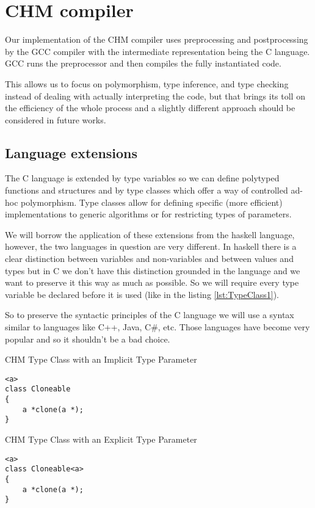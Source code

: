 \chapter{CHM compiler}

Our implementation of the CHM compiler uses preprocessing and postprocessing by the GCC compiler with the intermediate representation being the C language. GCC runs the preprocessor and then compiles the fully instantiated code.

This allows us to focus on polymorphism, type inference, and type checking instead of dealing with actually interpreting the code, but that brings its toll on the efficiency of the whole process and a slightly different approach should be considered in future works.

\section{Language extensions}

The C language is extended by type variables so we can define polytyped functions and structures and by type classes which offer a way of controlled ad-hoc polymorphism. Type classes allow for defining specific (more efficient) implementations to generic algorithms or for restricting types of parameters.

We will borrow the application of these extensions from the haskell language, however, the two languages in question are very different. In haskell there is a clear distinction between variables and non-variables and between values and types but in C we don't have this distinction grounded in the language and we want to preserve it this way as much as possible. So we will require every type variable be declared before it is used (like in the listing \ref{lst:TypeClass1}).

So to preserve the syntactic principles of the C language we will use a syntax similar to languages like C++, Java, C\#, etc. Those languages have become very popular and so it shouldn't be a bad choice.

\begin{listing}
\caption{CHM Type Class with an Implicit Type Parameter}
\label{lst:TypeClass1}
\begin{lstlisting}
<a>
class Cloneable
{
    a *clone(a *);
}
\end{lstlisting}
\end{listing}

\begin{listing}
\caption{CHM Type Class with an Explicit Type Parameter}
\label{lst:TypeClass2}
\begin{lstlisting}
<a>
class Cloneable<a>
{
    a *clone(a *);
}
\end{lstlisting}
\end{listing}

